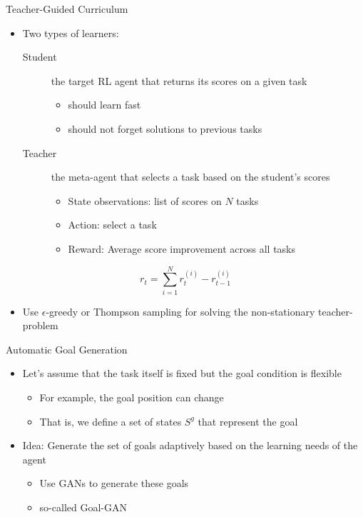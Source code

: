 \begin{frame}[c]{Teacher-Guided Curriculum }
	
	\begin{itemize}
		\item Two types of learners:
		\begin{description}
			\item[Student] the target RL agent that returns its scores on a given task
			\begin{itemize}
				\item should learn fast
				\item should not forget solutions to previous tasks
			\end{itemize}
			\item[Teacher] the meta-agent that selects a task based on the student's scores
			\begin{itemize}
				\item State observations: list of scores on $N$ tasks
				\item Action: select a task
				\item Reward: Average score improvement across all tasks
			\end{itemize}
		\end{description}
	\end{itemize}

	$$r_t = \sum_{i=1}^N r_t^{(i)} - r_{t-1}^{(i)}$$	
	
	\pause
	\begin{itemize}
		\item Use $\epsilon$-greedy or Thompson sampling for solving the non-stationary teacher-problem
	\end{itemize}
	
\end{frame}
\begin{frame}[c]{Automatic Goal Generation }
	
	\begin{itemize}
		\item Let's assume that the task itself is fixed but the goal condition is flexible
		\begin{itemize}
			\item For example, the goal position can change
			\item That is, we define a set of states $S^g$ that represent the goal
		\end{itemize}
		\pause
		\smallskip
		\item \alert{Idea:} Generate the set of goals adaptively based on the learning needs of the agent
		\begin{itemize}
			\item Use GANs to generate these goals
			\item so-called Goal-GAN
		\end{itemize}
	\end{itemize}
	
\end{frame}
